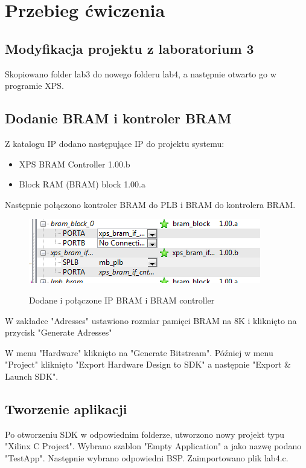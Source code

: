 \section{Przebieg ćwiczenia}
\subsection{Modyfikacja projektu z laboratorium 3}
Skopiowano folder lab3 do nowego folderu lab4, a następnie otwarto go w programie XPS.

\subsection{Dodanie BRAM i kontroler BRAM}
Z katalogu IP dodano następujące IP do projektu systemu:
\begin{itemize}
	\item XPS BRAM Controller 1.00.b
	\item Block RAM (BRAM) block 1.00.a
\end{itemize}

Następnie połączono kontroler BRAM do PLB i BRAM do kontrolera BRAM.

\begin{figure}[h]
	\centering
	\includegraphics{img/add_ram.PNG}
	\label{img:add_ram}
	\caption{Dodane i połączone IP BRAM i BRAM controller}
\end{figure}

W zakładce "Adresses" ustawiono rozmiar pamięci BRAM na 8K i kliknięto na przycisk "Generate Adresses"

W menu "Hardware" kliknięto na "Generate Bitstream". Później w menu "Project" kliknięto "Export Hardware Design to SDK" a następnie "Export \& Launch SDK".

\newpage
\subsection{Tworzenie aplikacji}
Po otworzeniu SDK w odpowiednim folderze, utworzono nowy projekt typu "Xilinx C Project". Wybrano szablon "Empty Application" a jako nazwę podano "TestApp". Następnie wybrano odpowiedni BSP. Zaimportowano plik lab4.c.


